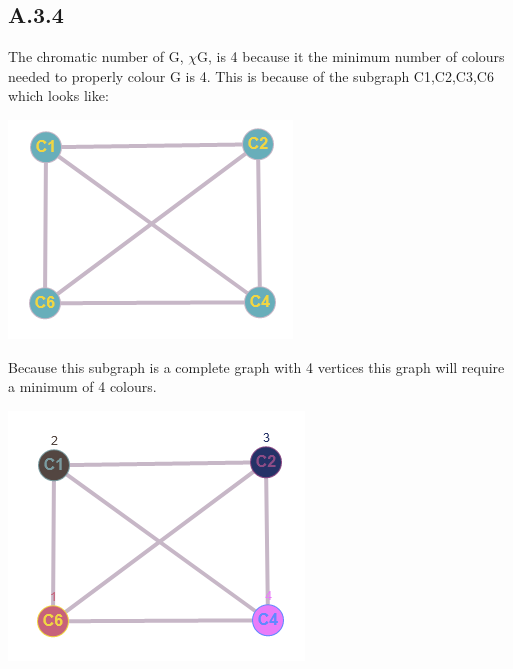 \documentclass{article}
\begin{document}
\subsection*{A.3.4}
The chromatic number of G, $\chi$G, is 4 because it the minimum number of colours needed to properly colour G is 4.
\newline
This is because of the subgraph C1,C2,C3,C6 which looks like:
\newline
\begin{center}
\includegraphics{a34}
\end{center}
Because this subgraph is a complete graph with 4 vertices this graph will require a minimum of 4 colours.
\begin{center}
\includegraphics{a34c}
\end{center}
\end{document}
